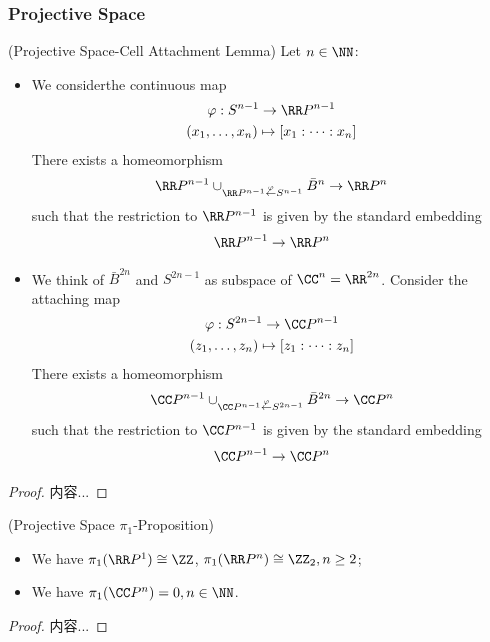 \documentclass[Total.tex]{subfiles}
\begin{document}
	\subsubsection{Projective Space}
	\begin{lemma}
		(Projective Space-Cell Attachment Lemma) Let $n\in \NN$:
		\begin{itemize}
			\item We considerthe continuous map
			\begin{gather*}
				\varphi:S^{n-1}\rightarrow \RR P^{n-1}\\
				(x_1,\dots,x_n)\mapsto [x_1:\dots:x_n]
			\end{gather*}
			There exists a homeomorphism
			\begin{gather*}
				\RR P^{n-1}\cup_{\RR P^{n-1}\stackrel{\varphi}{\leftarrow} S^{n-1}} \bar{B}^n\rightarrow \RR P^n  
			\end{gather*}
			such that the restriction to $\RR P^{n-1}$ is given by the standard embedding
			\begin{gather*}
				\RR P^{n-1}\rightarrow \RR P^n
			\end{gather*}
			\item We think of $\bar{B}^{2n}$ and $S^{2n-1}$ as subspace of $\CC^n=\RR^{2n}$. Consider the attaching map
			\begin{gather*}
				\varphi:S^{2n-1}\rightarrow \CC P^{n-1}\\
				(z_1,\dots,z_n)\mapsto [z_1:\dots:z_n]
			\end{gather*}
			There exists a homeomorphism
			\begin{gather*}
				\CC P^{n-1}\cup_{\CC P^{n-1}\stackrel{\varphi}{\leftarrow} S^{2n-1}} \bar{B}^{2n}\rightarrow \CC P^n  
			\end{gather*}
			such that the restriction to $\CC P^{n-1}$ is given by the standard embedding
			\begin{gather*}
				\CC P^{n-1}\rightarrow \CC P^n
			\end{gather*}
		\end{itemize}
	\end{lemma}
	\begin{proof}
		内容...
	\end{proof}
	
	\begin{proposition}
		(Projective Space $\pi_1$-Proposition)
		\begin{itemize}
			\item We have $\pi_1(\RR P^1)\cong \ZZ$, $\pi_1(\RR P^n)\cong \ZZ_2,n\geq  2$;
			\item We have $\pi_1(\CC P^n)=0,n\in \NN$.
		\end{itemize}
	\end{proposition}
	\begin{proof}
		内容...
	\end{proof}
\end{document}
